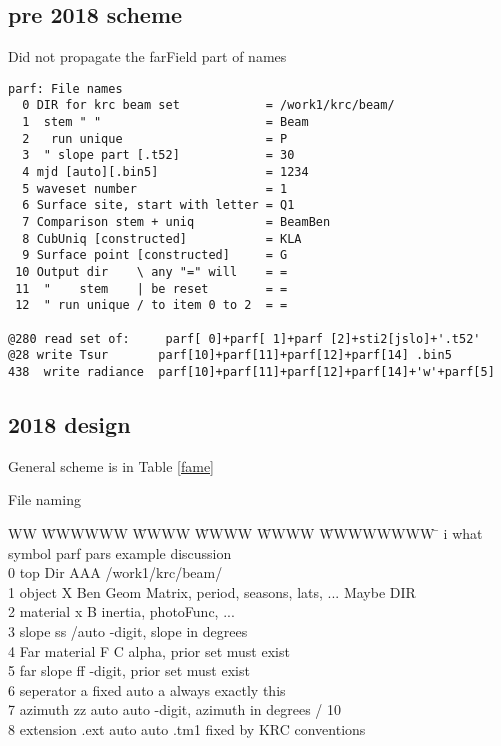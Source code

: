 \documentclass{article}
\begin{document}
\subsection{pre 2018 scheme}
Did not propagate the farField part of names
\vspace{-3.mm} 
\begin{verbatim}
parf: File names
  0 DIR for krc beam set            = /work1/krc/beam/
  1  stem " "                       = Beam
  2   run unique                    = P
  3  " slope part [.t52]            = 30
  4 mjd [auto][.bin5]               = 1234
  5 waveset number                  = 1
  6 Surface site, start with letter = Q1
  7 Comparison stem + uniq          = BeamBen
  8 CubUniq [constructed]           = KLA
  9 Surface point [constructed]     = G
 10 Output dir    \ any "=" will    = =
 11  "    stem    | be reset        = =
 12  " run unique / to item 0 to 2  = =

@280 read set of:     parf[ 0]+parf[ 1]+parf [2]+sti2[jslo]+'.t52'
@28 write Tsur       parf[10]+parf[11]+parf[12]+parf[14] .bin5
438  write radiance  parf[10]+parf[11]+parf[12]+parf[14]+'w'+parf[5]
\end{verbatim}  

\subsection{2018 design}
General scheme is in Table \ref{fame}
\begin{table} \caption[File naming]{File naming}  \label{fame}
\hrulefill 
\begin{tabbing} 
WW \= WWWWWW \= WWWW \= WWWW \=WWWW \= WWWWWWWW \=   \kill 
i \> what \> symbol \> parf \> pars \>example \> discussion \\
0  \> top Dir \> AAA   \> /work1/krc/beam/  \>   \\
1 \> object  \> X  \>   \> Ben \> Geom Matrix, period, seasons, lats, ... Maybe  DIR   \\
2 \> material\> x \>   \>  B \> inertia, photoFunc, ...  \\
3 \> slope   \> ss /auto \>   -digit, slope in degrees  \\
4 \> Far material \> F  \>  \> C  \> alpha, prior set must exist  \\
5 \> far slope  \> ff  \>    -digit, prior set must exist  \\
6 \> seperator  \> a \> fixed \> auto  \> a \> always exactly this  \\
7 \> azimuth    \> zz \> auto \> auto    -digit, azimuth in degrees / 10  \\
8 \> extension  \> .ext \> auto  \> auto \> .tm1 \> fixed by KRC conventions  \\
\end{tabbing}
\hrulefill \end{table}  
\end{document}
